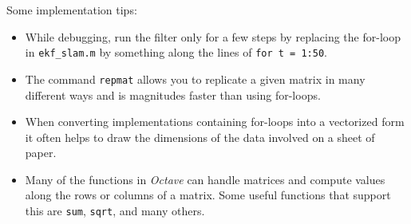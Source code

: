\documentclass[12pt,a4paper]{article}
\begin{document}

Some implementation tips:
\begin{itemize}
    \item While debugging, run the filter only for a few steps by
        replacing the for-loop in \texttt{ekf\_slam.m} by
        something along the lines of \texttt{for t = 1:50}.
    \item The command \texttt{repmat} allows you to replicate a given
        matrix in many different ways and is magnitudes faster than
        using for-loops.
    \item When converting implementations containing for-loops into a
        vectorized form it often helps to draw the dimensions of the
        data involved on a sheet of paper.
    \item Many of the functions in \emph{Octave} can handle matrices and
        compute values along the rows or columns of a matrix. Some
        useful functions that support this are \texttt{sum},
        \texttt{sqrt}, and many others.
\end{itemize}
\end{document}
